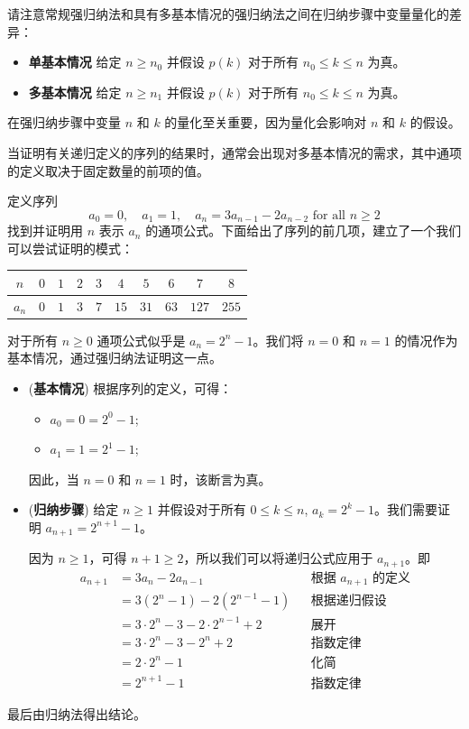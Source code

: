 请注意常规强归纳法和具有多基本情况的强归纳法之间在归纳步骤中变量量化的差异：
\begin{itemize}
\item \textbf{单基本情况 } 给定 $n \ge \boxed{n_0}$ 并假设 $p(k)$ 对于所有 $\boxed{n_0} \le k \le n$ 为真。
\item \textbf{多基本情况 } 给定 $n \ge \boxed{n_1}$ 并假设 $p(k)$ 对于所有 $\boxed{n_0} \le k \le n$ 为真。
\end{itemize}

在强归纳步骤中变量 $n$ 和 $k$ 的量化至关重要，因为量化会影响对 $n$ 和 $k$ 的假设。

当证明有关递归定义的序列的结果时，通常会出现对多基本情况的需求，其中通项的定义取决于固定数量的前项的值。

\begin{example}
定义序列
\[ a_0 = 0, \quad a_1 = 1, \quad a_n = 3a_{n-1} - 2a_{n-2} \text{ for all } n \ge 2 \]
找到并证明用 $n$ 表示 $a_n$ 的通项公式。下面给出了序列的前几项，建立了一个我们可以尝试证明的模式：
\begin{center}
\begin{tabular}{c|ccccccccc}
$n$   & $0$ & $1$ & $2$ & $3$ & $4$  & $5$  & $6$  & $7$   & $8$ \\ \hline
$a_n$ & $0$ & $1$ & $3$ & $7$ & $15$ & $31$ & $63$ & $127$ & $255$
\end{tabular}
\end{center}

对于所有 $n \ge 0$ 通项公式似乎是 $a_n = 2^n - 1$。我们将 $n=0$ 和 $n=1$ 的情况作为基本情况，通过强归纳法证明这一点。

\begin{itemize}
\item (\textbf{基本情况}) 根据序列的定义，可得：
\begin{itemize}
\item $a_0 = 0 = 2^0 - 1$;
\item $a_1 = 1 = 2^1 - 1$;
\end{itemize}
因此，当 $n=0$ 和 $n=1$ 时，该断言为真。

\item (\textbf{归纳步骤}) 给定 $n \ge 1$ 并假设对于所有 $0 \le k \le n$, $a_k = 2^k - 1$。我们需要证明 $a_{n+1} = 2^{n+1} - 1$。

因为 $n \ge 1$，可得 $n+1 \ge 2$，所以我们可以将递归公式应用于 $a_{n+1}$。即
\begin{align*}
a_{n+1} &= 3a_n - 2a_{n-1} && \text{根据 $a_{n+1}$ 的定义} \\
&= 3(2^n-1) - 2(2^{n-1}-1) && \text{根据递归假设} \\
&= 3 \cdot 2^n - 3 - 2 \cdot 2^{n-1} + 2 && \text{展开} \\
&= 3 \cdot 2^n - 3 - 2^n + 2 && \text{指数定律} \\
&= 2 \cdot 2^n - 1 && \text{化简} \\
&= 2^{n+1} - 1 && \text{指数定律}
\end{align*}
\end{itemize}
最后由归纳法得出结论。
\end{example}

